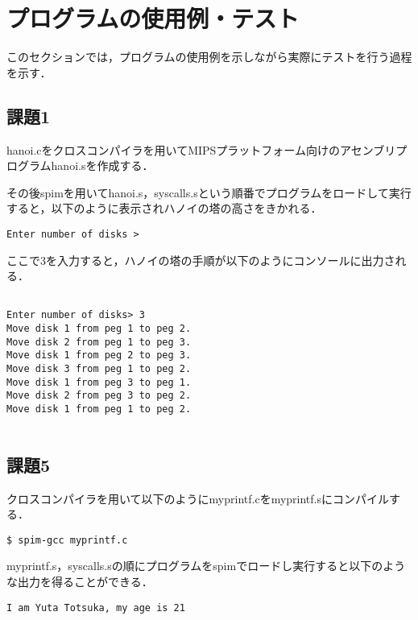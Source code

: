 \documentclass[a4j]{jarticle}
\begin{document}
%
%

\section{プログラムの使用例・テスト}

このセクションでは，プログラムの使用例を示しながら実際にテストを行う過程を示す．

\subsection{課題1}

hanoi.cをクロスコンパイラを用いてMIPSプラットフォーム向けのアセンブリプログラムhanoi.sを作成する．　

その後spimを用いてhanoi.s，syscalls.sという順番でプログラムをロードして実行すると，以下のように表示されハノイの塔の高さをきかれる．　

{\baselineskip 3mm
\begin{verbatim}
Enter number of disks > 
\end{verbatim}
}

ここで3を入力すると，ハノイの塔の手順が以下のようにコンソールに出力される．　

{\baselineskip 3mm
\begin{verbatim}

Enter number of disks> 3
Move disk 1 from peg 1 to peg 2.
Move disk 2 from peg 1 to peg 3.
Move disk 1 from peg 2 to peg 3.
Move disk 3 from peg 1 to peg 2.
Move disk 1 from peg 3 to peg 1.
Move disk 2 from peg 3 to peg 2.
Move disk 1 from peg 1 to peg 2.
 
\end{verbatim}
}





\subsection{課題5}

クロスコンパイラを用いて以下のようにmyprintf.cをmyprintf.sにコンパイルする．　

\begin{verbatim}
$ spim-gcc myprintf.c
\end{verbatim}


myprintf.s，syscalls.sの順にプログラムをspimでロードし実行すると以下のような出力を得ることができる．

{\baselineskip 3mm
\begin{verbatim}
I am Yuta Totsuka, my age is 21
\end{verbatim}
}
\end{document}
